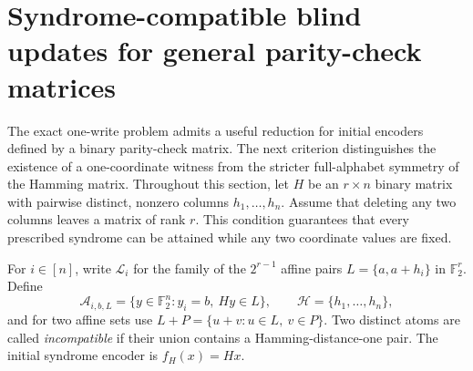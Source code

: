 \documentclass[11pt,a4paper]{article}
\begin{document}
\section{Syndrome-compatible blind updates for general parity-check matrices}\label{sec:general-syndrome}
The exact one-write problem admits a useful reduction for initial encoders defined by a binary parity-check matrix. The next criterion distinguishes the existence of a one-coordinate witness from the stricter full-alphabet symmetry of the Hamming matrix. Throughout this section, let $H$ be an $r\times n$ binary matrix with pairwise distinct, nonzero columns $h_1,\ldots,h_n$. Assume that deleting any two columns leaves a matrix of rank $r$. This condition guarantees that every prescribed syndrome can be attained while any two coordinate values are fixed.

For $i\in[n]$, write $\mathscr L_i$ for the family of the $2^{r-1}$ affine pairs $L=\{a,a+h_i\}$ in $\mathbb F_2^r$. Define
\[
\mathcal A_{i,b,L}=\{y\in\mathbb F_2^n:y_i=b,\ Hy\in L\},\qquad
\mathscr H=\{h_1,\ldots,h_n\},
\]
and for two affine sets use $L+P=\{u+v:u\in L,\ v\in P\}$. Two distinct atoms are called \emph{incompatible} if their union contains a Hamming-distance-one pair. The initial syndrome encoder is $f_H(x)=Hx$.
\end{document}
